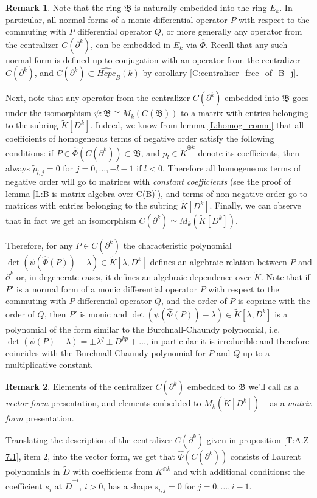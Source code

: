 \documentclass[11pt]{article}
\theoremstyle{definition}
\newtheorem{rem}{Remark}[section]
\theoremstyle{plain}
\numberwithin{equation}{section}
\begin{document}
\begin{rem}
\label{R:algebraic_dependence_of_normal_forms}
Note that the ring $\mathfrak{B}$ is naturally embedded into the ring $E_k$. In particular, all normal forms of a monic differential operator $P$ with respect to the commuting with $P$ differential operator $Q$, or more generally any operator from the centralizer $C(\partial^k)$, can be embedded in $E_k$ via $\hat{\Phi}$. Recall that any such normal form is defined up to conjugation with an operator from the centralizer $C(\partial^k)$, and $C(\partial^k)\subset \widehat{Hcpc}_B(k)$ by corollary \ref{C:centraliser_free_of_B_j}.  

Next, note that any operator from the centralizer $C(\partial^k)$ embedded into $\mathfrak{B}$ goes under the isomorphism $\psi : \mathfrak{B}\cong M_k(C(\mathfrak{B}))$ to a matrix with entries belonging to the subring $\tilde{K}[D^k]$. Indeed,  we know from lemma \ref{L:homog_comm} that all coefficients of homogeneous terms of negative order satisfy the following conditions: if $P\in \hat{\Phi} (C(\partial^k))\subset \mathfrak{B}$, and $p_l\in \tilde{K}^{\oplus k}$ denote its coefficients, then always $\tilde{p}_{l,j}=0$ for $j=0,\ldots , -l-1$ if $l<0$. Therefore all homogeneous terms of negative order will go to matrices with {\it constant coefficients} (see the proof of lemma \ref{L:B is matrix algebra over C(B)}), and terms of non-negative order go to matrices with entries belonging to the subring $\tilde{K}[D^k]$. Finally, we can observe that in fact we get an isomorphism $C(\partial^k)\simeq M_k(\tilde{K}[D^k])$.

Therefore, for any $P\in C(\partial^k)$ the characteristic polynomial $\det (\psi (\hat{\Phi}(P))-\lambda)\in \tilde{K}[\lambda , D^k]$ defines an algebraic relation between $P$ and $\partial^k$ or, in degenerate cases, it defines an algebraic dependence over $\tilde{K}$. Note that if $P'$ is a normal form  of a monic differential operator $P$ with respect to the commuting with $P$ differential operator $Q$, and the order of $P$ is coprime with the order of $Q$, then $P'$ is monic and $\det (\psi (\hat{\Phi}(P))-\lambda)\in \tilde{K}[\lambda , D^k]$ is a polynomial of the form similar to the Burchnall-Chaundy polynomial, i.e. $\det (\psi (P)-\lambda) =  \pm\lambda^q\pm D^{kp}+\ldots $, in particular it is irreducible and therefore coincides with the Burchnall-Chaundy polynomial for $P$ and $Q$ up to a multiplicative constant. 
\end{rem}

\begin{rem}
\label{R:vector_form}
Elements of the centralizer $C(\partial^k)$ embedded to $\mathfrak{B}$ we'll call as a {\it vector form} presentation, and elements embedded to $M_k(\tilde{K}[D^k])$ -- as a {\it matrix form} presentation. 

Translating the description of the centralizer $C(\partial^k)$ given in proposition \ref{T:A.Z 7.1}, item 2, into the vector form, we get that $\hat{\Phi}(C(\partial^k))$ consists of Laurent polynomials in 
$\tilde{D}$ with coefficients from $K^{\oplus k}$ and with additional conditions: the coefficient $s_i$ at $\tilde{D}^{-i}$, $i>0$, has a shape $s_{i,j}=0$ for $j=0, \ldots , i-1$. 
\end{rem}
\end{document}
